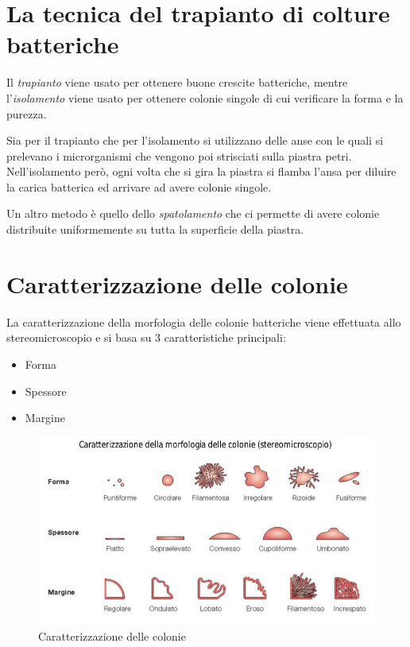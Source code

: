 \documentclass[11pt]{book}
\begin{document}
\section{La tecnica del trapianto di colture batteriche}
Il \emph{trapianto} viene usato per ottenere buone crescite batteriche, mentre l'\emph{isolamento} viene usato per ottenere colonie singole di cui verificare la forma e la purezza.

Sia per il trapianto che per l'isolamento si utilizzano delle anse con le quali si prelevano i microrganismi che vengono poi strisciati sulla piastra petri. Nell'isolamento però, ogni volta che si gira la piastra si flamba l'ansa per diluire la carica batterica ed arrivare ad avere colonie singole.

Un altro metodo è quello dello \emph{spatolamento} che ci permette di avere colonie distribuite uniformemente su tutta la superficie della piastra.

\clearpage

\section{Caratterizzazione delle colonie}
La caratterizzazione della morfologia delle colonie batteriche viene effettuata allo stereomicroscopio e si basa su 3 caratteristiche principali:
\begin{itemize}
\item Forma 
\item Spessore
\item Margine
\end{itemize}

\begin{figure}[htp]
\centering
\includegraphics[scale=0.4]{img/Forma delle colonie.png}
\caption{Caratterizzazione delle colonie}
\label{}
\end{figure}
\end{document}
